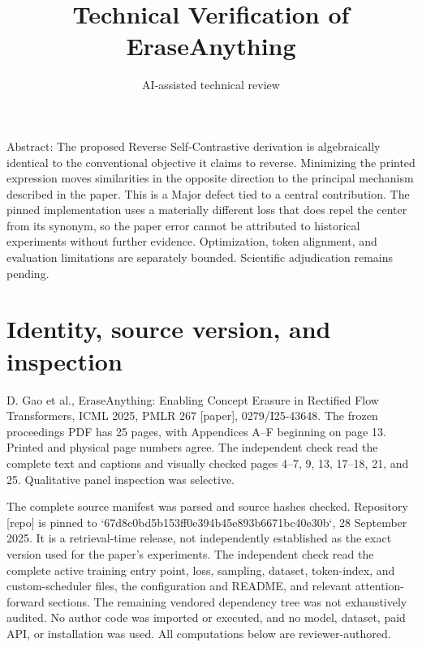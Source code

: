 \documentclass[10pt]{article}
\title{Technical Verification of EraseAnything}
\author{AI-assisted technical review}
\date{}
\begin{document}
\maketitle
Abstract: The proposed Reverse Self-Contrastive derivation is algebraically identical to the conventional objective it claims to reverse. Minimizing the printed expression moves similarities in the opposite direction to the principal mechanism described in the paper. This is a Major defect tied to a central contribution. The pinned implementation uses a materially different loss that does repel the center from its synonym, so the paper error cannot be attributed to historical experiments without further evidence. Optimization, token alignment, and evaluation limitations are separately bounded. Scientific adjudication remains pending.\par
\section*{Identity, source version, and inspection}
D. Gao et al., EraseAnything: Enabling Concept Erasure in Rectified Flow Transformers, ICML 2025, PMLR 267 [paper], 0279/I25-43648. The frozen proceedings PDF has 25 pages, with Appendices A–F beginning on page 13. Printed and physical page numbers agree. The independent check read the complete text and captions and visually checked pages 4–7, 9, 13, 17–18, 21, and 25. Qualitative panel inspection was selective.\par
The complete source manifest was parsed and source hashes checked. Repository [repo] is pinned to `67d8c0bd5b153ff0e394b45e893b6671bc40e30b`, 28 September 2025. It is a retrieval-time release, not independently established as the exact version used for the paper’s experiments. The independent check read the complete active training entry point, loss, sampling, dataset, token-index, and custom-scheduler files, the configuration and README, and relevant attention-forward sections. The remaining vendored dependency tree was not exhaustively audited. No author code was imported or executed, and no model, dataset, paid API, or installation was used. All computations below are reviewer-authored.\par
\end{document}
